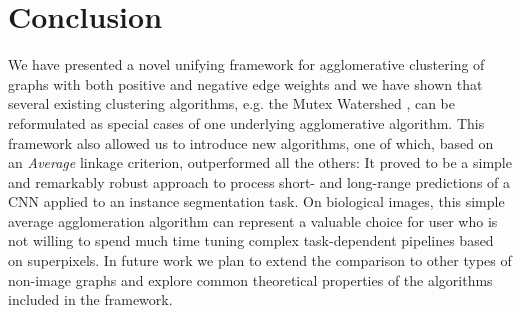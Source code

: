 \section{Conclusion}
We have presented a novel unifying framework for agglomerative clustering of graphs with both positive and negative edge weights and we have shown that several existing clustering algorithms, e.g. the Mutex Watershed \cite{wolf2018mutex}, can be reformulated as special cases of one underlying agglomerative algorithm. This framework also allowed us to introduce new algorithms, one of which, based on an \emph{Average} linkage criterion, outperformed all the others: It proved to be a simple and remarkably robust approach to process short- and long-range predictions of a CNN applied to an instance segmentation task.
On biological images, this simple average agglomeration algorithm can represent a valuable choice for user who is not willing to spend much time tuning complex task-dependent pipelines based on superpixels.  %
In future work we plan to extend the comparison to other types of non-image graphs and explore common theoretical properties of the algorithms included in the framework.
